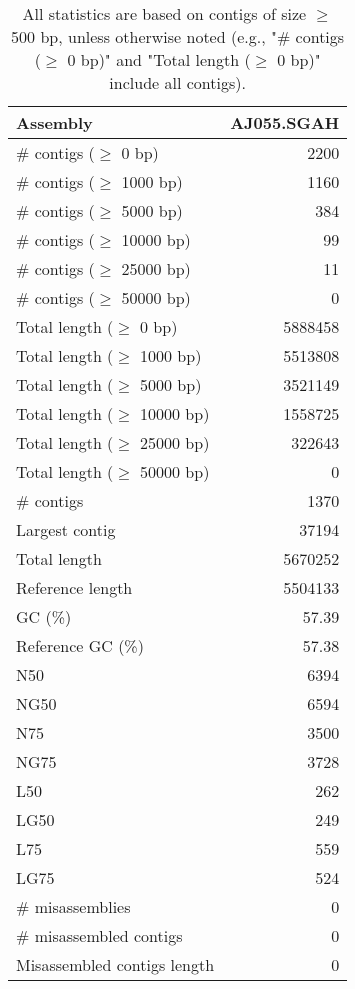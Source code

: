 \documentclass[12pt,a4paper]{article}
\begin{document}
\begin{table}[ht]
\begin{center}
\caption{All statistics are based on contigs of size $\geq$ 500 bp, unless otherwise noted (e.g., "\# contigs ($\geq$ 0 bp)" and "Total length ($\geq$ 0 bp)" include all contigs).}
\begin{tabular}{|l*{1}{|r}|}
\hline
Assembly & AJ055.SGAH \\ \hline
\# contigs ($\geq$ 0 bp) & 2200 \\ \hline
\# contigs ($\geq$ 1000 bp) & 1160 \\ \hline
\# contigs ($\geq$ 5000 bp) & 384 \\ \hline
\# contigs ($\geq$ 10000 bp) & 99 \\ \hline
\# contigs ($\geq$ 25000 bp) & 11 \\ \hline
\# contigs ($\geq$ 50000 bp) & 0 \\ \hline
Total length ($\geq$ 0 bp) & 5888458 \\ \hline
Total length ($\geq$ 1000 bp) & 5513808 \\ \hline
Total length ($\geq$ 5000 bp) & 3521149 \\ \hline
Total length ($\geq$ 10000 bp) & 1558725 \\ \hline
Total length ($\geq$ 25000 bp) & 322643 \\ \hline
Total length ($\geq$ 50000 bp) & 0 \\ \hline
\# contigs & 1370 \\ \hline
Largest contig & 37194 \\ \hline
Total length & 5670252 \\ \hline
Reference length & 5504133 \\ \hline
GC (\%) & 57.39 \\ \hline
Reference GC (\%) & 57.38 \\ \hline
N50 & 6394 \\ \hline
NG50 & 6594 \\ \hline
N75 & 3500 \\ \hline
NG75 & 3728 \\ \hline
L50 & 262 \\ \hline
LG50 & 249 \\ \hline
L75 & 559 \\ \hline
LG75 & 524 \\ \hline
\# misassemblies & 0 \\ \hline
\# misassembled contigs & 0 \\ \hline
Misassembled contigs length & 0 \\ \hline

\end{tabular}
\end{center}
\end{table}
\end{document}

